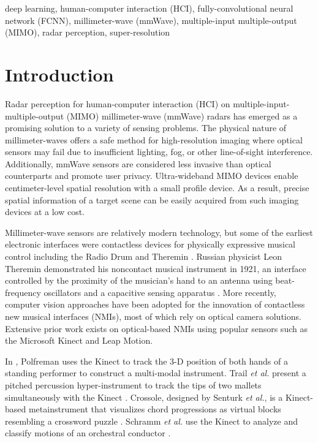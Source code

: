 \documentclass[10pt,journal,final]{IEEEtran}
\begin{document}
\begin{IEEEkeywords}
	deep learning, human-computer interaction (HCI), fully-convolutional neural network (FCNN), millimeter-wave (mmWave), multiple-input multiple-output (MIMO), radar perception, super-resolution
\end{IEEEkeywords}


\section{Introduction}
\label{sec:introduction}
Radar perception for human-computer interaction (HCI) on multiple-input-multiple-output (MIMO) millimeter-wave (mmWave) radars has emerged as a promising solution to a variety of sensing problems. 
The physical nature of millimeter-waves offers a safe method for high-resolution imaging where optical sensors may fail due to insufficient lighting, fog, or other line-of-sight interference. 
Additionally, mmWave sensors are considered less invasive than optical counterparts and promote user privacy.
Ultra-wideband MIMO devices enable centimeter-level spatial resolution with a small profile device.
As a result, precise spatial information of a target scene can be easily acquired from such imaging devices at a low cost.

Millimeter-wave sensors are relatively modern technology, but some of the earliest electronic interfaces were contactless devices for physically expressive musical control including the Radio Drum and Theremin \cite{intro:theremin_and_radio_drum}. 
Russian physicist Leon Theremin demonstrated his noncontact musical instrument in 1921, an interface controlled by the proximity of the musician's hand to an antenna using beat-frequency oscillators and a capacitive sensing apparatus \cite{intro:phyics_of_the_theremin}. 
More recently, computer vision approaches have been adopted for the innovation of contactless new musical interfaces (NMIs), most of which rely on optical camera solutions. 
Extensive prior work exists on optical-based NMIs using popular sensors such as the Microsoft Kinect and Leap Motion. 

In \cite{polfreman2011multi}, Polfreman uses the Kinect to track the 3-D position of both hands of a standing performer to construct a multi-modal instrument. 
Trail \textit{et al.} present a pitched percussion hyper-instrument to track the tips of two mallets simultaneously with the Kinect \cite{trail2012non}. 
Crossole, designed by Senturk \textit{et al.}, is a Kinect-based metainstrument that visualizes chord progressions as virtual blocks resembling a crossword puzzle \cite{senturk2012crossole}. 
Schramm \textit{et al.} use the Kinect to analyze and classify motions of an orchestral conductor \cite{optical_tracking:rgbd}. 
\end{document}

